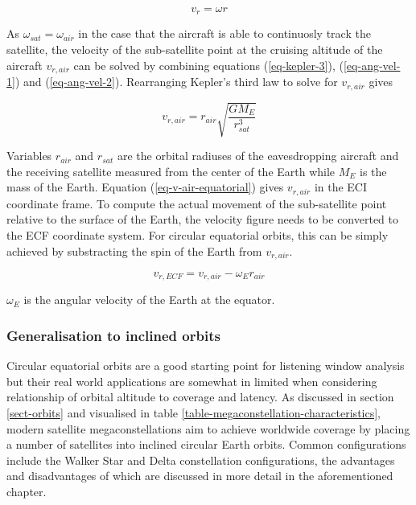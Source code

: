 \documentclass[english, 12pt, a4paper, elec, utf8, a-1b, online]{aaltothesis}
\begin{document}
\begin{equation} \label{eq-ang-vel-2}
  v_r = \omega r
\end{equation}

\noindent
As $\omega_{sat} = \omega_{air}$ in the case that the aircraft is able to continuosly track the satellite, the velocity of the sub-satellite point at the cruising altitude of the aircraft $v_{r, air}$ can be solved by combining equations (\ref{eq-kepler-3}), (\ref{eq-ang-vel-1}) and (\ref{eq-ang-vel-2}).
Rearranging Kepler's third law to solve for $v_{r, air}$ gives

\begin{equation} \label{eq-v-air-equatorial}
  v_{r, air} = r_{air} \sqrt{\frac{G M_E}{r_{sat}^3}}
\end{equation}

\noindent
Variables $r_{air}$ and $r_{sat}$ are the orbital radiuses of the eavesdropping aircraft and the receiving satellite measured from the center of the Earth while $M_E$ is the mass of the Earth.
Equation (\ref{eq-v-air-equatorial}) gives $v_{r, air}$ in the ECI coordinate frame.
To compute the actual movement of the sub-satellite point relative to the surface of the Earth, the velocity figure needs to be converted to the ECF coordinate system.
For circular equatorial orbits, this can be simply achieved by substracting the spin of the Earth from $v_{r, air}$.

\begin{equation}
  v_{r, ECF} = v_{r, air} - \omega_E r_{air}
\end{equation}

\noindent
$\omega_E$ is the angular velocity of the Earth at the equator.

\subsubsection{Generalisation to inclined orbits}

Circular equatorial orbits are a good starting point for listening window analysis but their real world applications are somewhat in limited when considering relationship of orbital altitude to coverage and latency.
As discussed in section \ref{sect-orbits} and visualised in table \ref{table-megaconstellation-characteristics}, modern satellite megaconstellations aim to achieve worldwide coverage by placing a number of satellites into inclined circular Earth orbits.
Common configurations include the Walker Star and Delta constellation configurations, the advantages and disadvantages of which are discussed in more detail in the aforementioned chapter.
\end{document}
